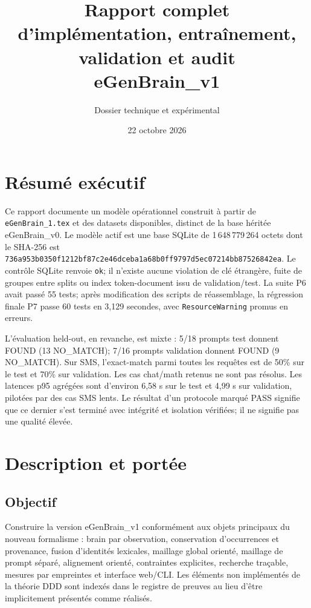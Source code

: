 \documentclass[11pt,a4paper,openany]{book}
\title{Rapport complet d'implémentation, entraînement, validation et audit\\eGenBrain\_v1}
\author{Dossier technique et expérimental}
\date{22 octobre 2026}
\begin{document}
\maketitle\tableofcontents
\chapter*{Résumé exécutif}
Ce rapport documente un modèle opérationnel construit à partir de \texttt{eGenBrain\_1.tex} et des datasets disponibles, distinct de la base héritée eGenBrain\_v0. Le modèle actif est une base SQLite de 1\,648\,779\,264 octets dont le SHA-256 est \texttt{736a953b0350f1212bf87c2e46dceba1a68b0ff9797d5ec07214bb87526842ea}. Le contrôle SQLite renvoie \texttt{ok}; il n'existe aucune violation de clé étrangère, fuite de groupes entre splits ou index token-document issu de validation/test. La suite P6 avait passé 55 tests; après modification des scripts de réassemblage, la régression finale P7 passe 60 tests en 3,129 secondes, avec \texttt{ResourceWarning} promus en erreurs.

L'évaluation held-out, en revanche, est mixte : 5/18 prompts test donnent FOUND (13 NO\_MATCH); 7/16 prompts validation donnent FOUND (9 NO\_MATCH). Sur SMS, l'exact-match parmi toutes les requêtes est de 50\% sur le test et 70\% sur validation. Les cas chat/math retenus ne sont pas résolus. Les latences p95 agrégées sont d'environ 6,58 s sur le test et 4,99 s sur validation, pilotées par des cas SMS lents. Le résultat d'un protocole marqué PASS signifie que ce dernier s'est terminé avec intégrité et isolation vérifiées; il ne signifie pas une qualité élevée.

\chapter{Description et portée}
\section{Objectif}
Construire la version eGenBrain\_v1 conformément aux objets principaux du nouveau formalisme : brain par observation, conservation d'occurrences et provenance, fusion d'identités lexicales, maillage global orienté, maillage de prompt séparé, alignement orienté, contraintes explicites, recherche traçable, mesures par empreintes et interface web/CLI. Les éléments non implémentés de la théorie DDD sont indexés dans le registre de preuves au lieu d'être implicitement présentés comme réalisés.
\end{document}
